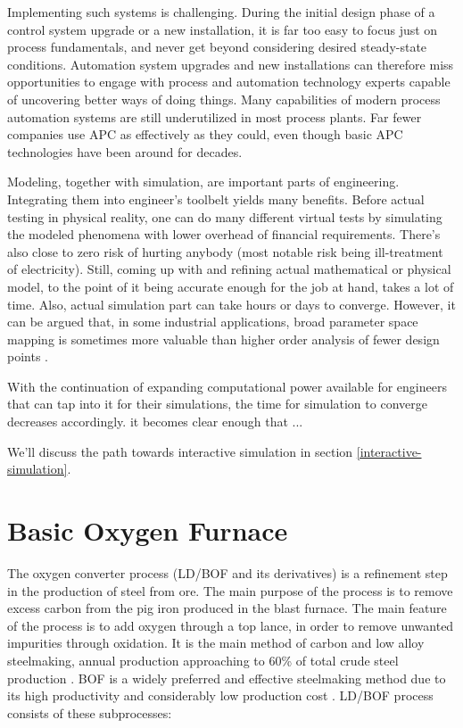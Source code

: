 Implementing such systems is challenging. During the initial design phase of a control system upgrade or a new installation, it is far too easy to focus just on process fundamentals, and never get beyond considering desired steady-state conditions. Automation system upgrades and new installations can therefore miss opportunities to engage with process and automation technology experts capable of uncovering better ways of doing things. Many capabilities of modern process automation systems are still underutilized in most process plants. Far fewer companies use APC as effectively as they could, even though basic APC technologies have been around for decades.

Modeling, together with simulation, are important parts of engineering. Integrating them into engineer's toolbelt yields many benefits. Before actual testing in physical reality, one can do many different virtual tests by simulating the modeled phenomena with lower overhead of financial requirements. There's also close to zero risk of hurting anybody (most notable risk being ill-treatment of electricity). Still, coming up with and refining actual mathematical or physical model, to the point of it being accurate enough for the job at hand, takes a lot of time. Also, actual simulation part can take hours or days to converge. However, it can be argued that, in some industrial applications, broad parameter space mapping is sometimes more valuable than higher order analysis of fewer design points \citep{harwoodREALTIMEMODELLINGSIMULATION}.

With the continuation of expanding computational power available for engineers that can tap into it for their simulations, the time for simulation to converge decreases accordingly. it becomes clear enough that ...

We'll discuss the path towards interactive simulation in section \ref{interactive-simulation}.


\section{Basic Oxygen Furnace}

The oxygen converter process (LD/BOF and its derivatives) is a refinement step in the production of steel from ore. The main purpose of the process is to remove excess carbon from the pig iron produced in the blast furnace. The main feature of the process is to add oxygen through a top lance, in order to remove unwanted impurities through oxidation. It is the main method of carbon and low alloy steelmaking, annual production approaching to 60\% of total crude steel production \cite{Jalkanen2006}. BOF is a widely preferred and effective steelmaking method due to its high productivity and considerably low production cost \cite{Wang2010}. LD/BOF process consists of these subprocesses:

